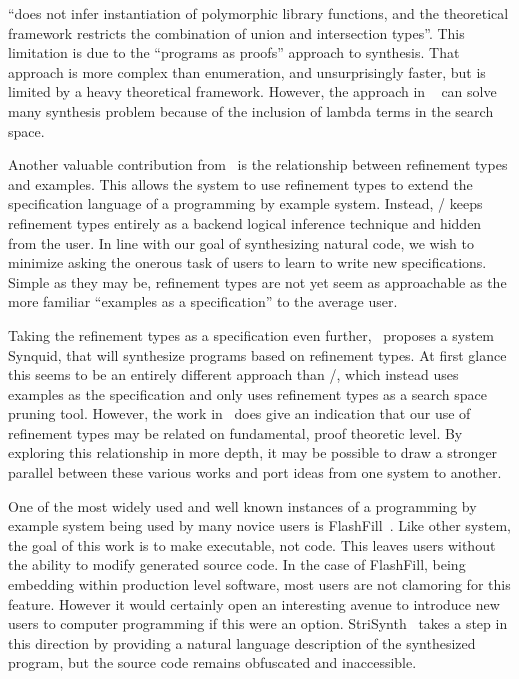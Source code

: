 \cite{Osera:2016} ``does not infer instantiation of polymorphic library functions, and the theoretical framework restricts the combination of union and intersection types''.
This limitation is due to the ``programs as proofs'' approach to synthesis.
That approach is more complex than enumeration, and unsurprisingly faster, but is limited by a heavy theoretical framework.
However, the approach in ~\cite{Osera:2016} can solve many synthesis problem because of the inclusion of lambda terms in the search space.

Another valuable contribution from~\cite{Osera:2016} is the relationship between refinement types and examples.
This allows the system to use refinement types to extend the specification language of a programming by example system.
Instead, \ourTool/ keeps refinement types entirely as a backend logical inference technique and hidden from the user.
In line with our goal of synthesizing natural code, we wish to minimize  asking the onerous task of users to learn to write new specifications.
Simple as they may be, refinement types are not yet seem as approachable as the more familiar ``examples as a specification'' to the average user.

Taking the refinement types as a specification even further,~\cite{dblp1683325} proposes a system Synquid, that will synthesize programs based on refinement types. 
At first glance this seems to be an entirely different approach than \ourTool/, which instead uses examples as the specification and only uses refinement types as a search space pruning tool.
However, the work in~\cite{Osera:2016} does give an indication that our use of refinement types may be related on fundamental, proof theoretic level. 
By exploring this relationship in more depth, it may be possible to draw a stronger parallel between these various works and port ideas from one system to another.

One of the most widely used and well known instances of a programming by example system being used by many novice users is FlashFill~\cite{GulwaniHS12}.
Like other system, the goal of this work is to make executable, not code. 
This leaves users without the ability to modify generated source code.
In the case of FlashFill, being embedding within production level software, most users are not clamoring for this feature.
However it would certainly open an interesting avenue to introduce new users to computer programming if this were an option.
StriSynth~\cite{icse} takes a step in this direction by providing a natural language description of the synthesized program, but the source code remains obfuscated and inaccessible.

